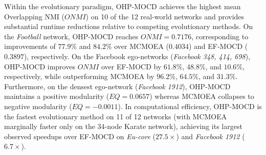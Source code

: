 \documentclass{svproc}
\begin{document}
Within the evolutionary paradigm, OHP-MOCD achieves the highest mean Overlapping NMI ($ONMI$) on 10 of the 12 real-world networks and provides substantial runtime reductions relative to competing evolutionary methods. On the \textit{Football} network, OHP-MOCD reaches $ONMI = 0.7176$, corresponding to improvements of $77.9\%$ and $84.2\%$ over MCMOEA ($0.4034$) and EF-MOCD ($0.3897$), respectively. On the Facebook ego-networks (\textit{Facebook 348, 414, 698}), OHP-MOCD improves $ONMI$ over EF-MOCD by $61.8\%$, $48.8\%$, and $10.6\%$, respectively, while outperforming MCMOEA by $96.2\%$, $64.5\%$, and $31.3\%$. Furthermore, on the densest ego-network (\textit{Facebook 1912}), OHP-MOCD maintains a positive modularity ($EQ = 0.0657$) whereas MCMOEA collapses to negative modularity ($EQ = -0.0011$). In computational efficiency, OHP-MOCD is the fastest evolutionary method on 11 of 12 networks (with MCMOEA marginally faster only on the 34-node Karate network), achieving its largest observed speedups over EF-MOCD on \textit{Eu-core} ($27.5\times$) and \textit{Facebook 1912} ($6.7\times$).
\end{document}
